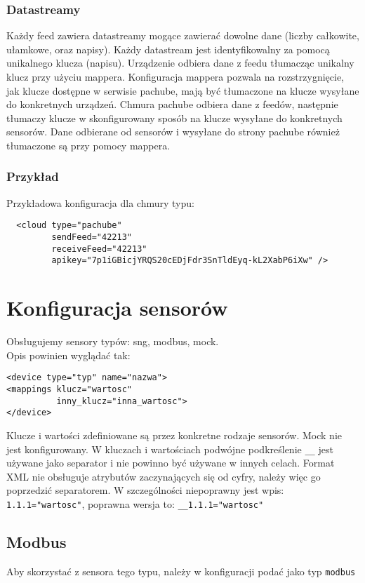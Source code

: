 \documentclass[11pt]{article}
\begin{document}
\subsubsection{Datastreamy}
Każdy feed zawiera datastreamy mogące zawierać dowolne dane (liczby całkowite, ułamkowe, oraz napisy). Każdy datastream jest identyfikowalny za pomocą unikalnego klucza (napisu). Urządzenie odbiera dane z feedu tłumacząc unikalny klucz przy użyciu mappera. Konfiguracja mappera pozwala na rozstrzygnięcie, jak klucze dostępne w serwisie pachube, mają być tłumaczone na klucze wysyłane do konkretnych urządzeń. Chmura pachube odbiera dane z feedów, następnie tłumaczy klucze w skonfigurowany sposób na klucze wysyłane do konkretnych sensorów.
Dane odbierane od sensorów i wysyłane do strony pachube również tłumaczone są przy pomocy mappera.

\subsubsection{Przykład}

Przykładowa konfiguracja dla chmury typu:
\begin{verbatim}
  <cloud type="pachube" 
         sendFeed="42213" 
         receiveFeed="42213" 
         apikey="7p1iGBicjYRQS20cEDjFdr3SnTldEyq-kL2XabP6iXw" />
\end{verbatim}




\section{Konfiguracja sensorów}
Obsługujemy sensory typów: sng, modbus, mock.\\

Opis powinien wyglądać tak:
\begin{verbatim}
<device type="typ" name="nazwa">
<mappings klucz="wartosc"
          inny_klucz="inna_wartosc">
</device>
\end{verbatim}

Klucze i wartości zdefiniowane są przez konkretne rodzaje sensorów. Mock nie jest konfigurowany.
W kluczach i wartościach podwójne podkreślenie \verb|__| jest używane jako separator i nie
powinno być używane w innych celach. Format XML nie obsługuje atrybutów zaczynających się od cyfry,
należy więc go poprzedzić separatorem. W szczególności niepoprawny jest wpis: \verb|1.1.1="wartosc"|,
poprawna wersja to: \verb|__1.1.1="wartosc"|


\subsection{Modbus}
Aby skorzystać z sensora tego typu, należy w konfiguracji podać jako typ \verb|modbus|
\end{document}
